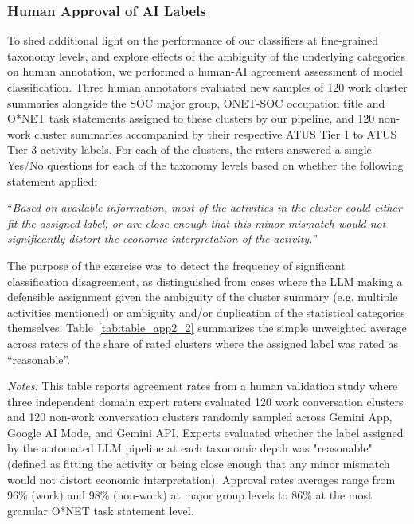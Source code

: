 \documentclass[11pt,a4paper]{article}
\begin{document}
\subsubsection{Human Approval of AI Labels}
To shed additional light on the performance of our classifiers at fine-grained taxonomy levels, and explore effects of the ambiguity of the underlying categories on human annotation, we performed a human-AI agreement assessment of model classification. Three human annotators evaluated new samples of 120 work cluster summaries alongside the SOC major group, ONET-SOC occupation title and O*NET task statements assigned to these clusters by our pipeline, and 120 non-work cluster summaries  accompanied by their respective ATUS Tier 1 to ATUS Tier 3 activity labels. For each of the clusters, the raters answered a single Yes/No questions for each of the taxonomy levels based on whether the following statement applied: 

``\textit{Based on available information, most of the activities in the cluster could either fit the assigned label, or are close enough that this minor mismatch would not significantly distort the economic interpretation of the activity.}''

The purpose of the exercise was to detect the frequency of significant classification disagreement, as distinguished from cases where the LLM making a defensible assignment given the ambiguity of the cluster summary (e.g. multiple activities mentioned) or ambiguity and/or duplication of the statistical categories themselves. Table~\ref{tab:table_app2_2} summarizes the simple unweighted average across raters of the share of rated clusters where the assigned label was rated as ``reasonable''.

\begin{table}[htbp]
    \centering
    \caption{Human Expert Review Validates Automated Taxonomic Classifications as ``Reasonable''}
    \label{tab:table_app2_2}

    \vspace{0.2cm}
    \parbox{\textwidth}{\footnotesize \textit{Notes:} This table reports agreement rates from a human validation study where three independent domain expert raters evaluated 120 work conversation clusters and 120 non-work conversation clusters randomly sampled across Gemini App, Google AI Mode, and Gemini API. Experts evaluated whether the label assigned by the automated LLM pipeline at each taxonomic depth was "reasonable" (defined as fitting the activity or being close enough that any minor mismatch would not distort economic interpretation). Approval rates averages range from 96\% (work) and 98\% (non-work) at major group levels to 86\% at the most granular O*NET task statement level.}
\end{table}
\end{document}
